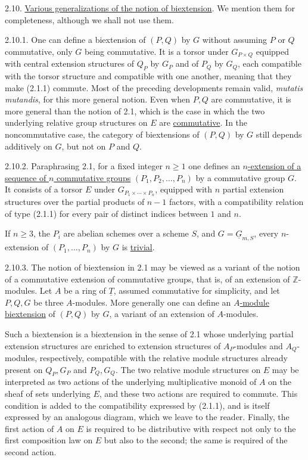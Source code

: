 
2.10. \underline{Various generalizations of the notion of
biextension}. We mention them for completeness, although we shall not
use them.

2.10.1. One can define a biextension of $(P,Q)$ by $G$ without
assuming $P$ or $Q$ commutative, only $G$ being commutative. It is a
torsor under $G_{P\times Q}$ equipped with central extension
structures of $Q_P$ by $G_P$ and of $P_Q$ by $G_Q$, each compatible
with the torsor structure and compatible with one another, meaning
that they make (2.1.1) commute. Most of the preceding developments
remain valid, \emph{mutatis mutandis}, for this more general notion.
Even when $P,Q$ are commutative, it is more general than the notion of
2.1, which is the case in which the two underlying relative group
structures on $E$ are \underline{commutative}. In the noncommutative
case, the category of biextensions of $(P,Q)$ by $G$ still depends
additively on $G$, but not on $P$ and $Q$.

2.10.2. Paraphrasing 2.1, for a fixed integer $n\geq1$ one defines an
\underline{$n$-extension of a sequence of $n$ commutative groups}
$(P_1,P_2,\ldots,P_n)$ by a commutative group $G$. It consists of a
torsor $E$ under $G_{P_1\times\cdots\times P_n}$, equipped with $n$
partial extension structures over the partial products of $n-1$
factors, with a compatibility relation of type (2.1.1) for every pair
of distinct indices between $1$ and $n$.

If $n\geq3$, the $P_i$ are abelian schemes over a scheme $S$, and
$G=\underline G_{m,S}$, every $n$-extension of
$(P_1,\ldots,P_n)$ by $G$ is \underline{trivial}.

2.10.3. The notion of biextension in 2.1 may be viewed as a variant of
the notion of a commutative extension of commutative groups, that is,
of an extension of $\mathbb Z$-modules. Let $A$ be a ring of
$\underline T$, assumed commutative for simplicity, and let $P,Q,G$
be three $A$-modules. More generally one can define an
\underline{$A$-module biextension} of $(P,Q)$ by $G$, a variant of an
extension of $A$-modules.

Such a biextension is a biextension in the sense of 2.1 whose
underlying partial extension structures are enriched to extension
structures of $A_P$-modules and $A_Q$-modules, respectively,
compatible with the relative module structures already present on
$Q_P,G_P$ and $P_Q,G_Q$. The two relative module structures on $E$
may be interpreted as two actions of the underlying multiplicative
monoid of $A$ on the sheaf of sets underlying $E$, and these two
actions are required to commute. This condition is added to the
compatibility expressed by (2.1.1), and is itself expressed by an
analogous diagram, which we leave to the reader. Finally, the first
action of $A$ on $E$ is required to be distributive with respect not
only to the first composition law on $E$ but also to the second; the
same is required of the second action.

